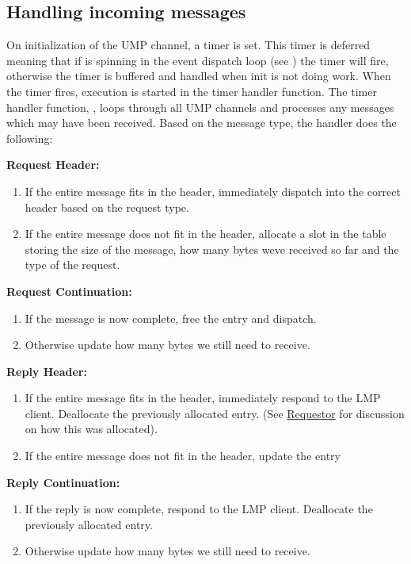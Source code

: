 \subsection{Handling incoming messages} 
On initialization of the UMP channel, a timer is set. This timer is deferred meaning that if  is spinning in the 
event dispatch loop (see ) the timer will fire, otherwise the timer is buffered and handled when init is not doing work.
When the timer fires, execution is started in the timer handler function. The timer handler function, , loops through all UMP channels and processes any messages which may have
 been received. Based on the message type, the handler does the following:
 \begin{description}
    \item \textbf{Request Header:}
    \begin{enumerate}
        \item If the entire message fits in the header, immediately dispatch into the correct header based on
        the request type.
        \item If the entire message does not fit in the header, allocate a slot in the  table storing the size of the message, how many bytes weve received so far 
        and the type of the request.
    \end{enumerate}
    \item \textbf{Request Continuation:}
    \begin{enumerate}
        \item If the message is now complete, free the  entry and dispatch.
        \item Otherwise update how many bytes we still need to receive.
    \end{enumerate}
    \item \textbf{Reply Header:}
    \begin{enumerate}
        \item If the entire message fits in the header, immediately respond to the LMP client. Deallocate the
        previously allocated  entry. (See \hyperref[sec:requestor]{Requestor} for discussion on how this was allocated).
        \item If the entire message does not fit in the header, update the   entry 
    \end{enumerate}
     \item \textbf{Reply Continuation:}
    \begin{enumerate}
        \item If the reply is now complete, respond to the LMP client. Deallocate the
        previously allocated  entry. 
        \item Otherwise update how many bytes we still need to receive.
    \end{enumerate}

 \end{description}


